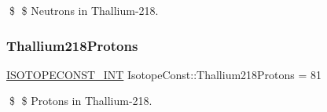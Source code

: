 \$ \$ Neutrons in Thallium-\/218. \mbox{\label{group___isotope_const-_thallium-_tl218_ga3fe882f06cbeb8a701db740274f17a8c}} 
\subsubsection{\texorpdfstring{Thallium218\+Protons}{Thallium218Protons}}
{\footnotesize\ttfamily \mbox{\hyperlink{group___isotope_const-_macros_ga5f18360b3e99483a35c32d789e62621c}{I\+S\+O\+T\+O\+P\+E\+C\+O\+N\+S\+T\+\_\+\+I\+NT}} Isotope\+Const\+::\+Thallium218\+Protons = 81}

\$ \$ Protons in Thallium-\/218. 